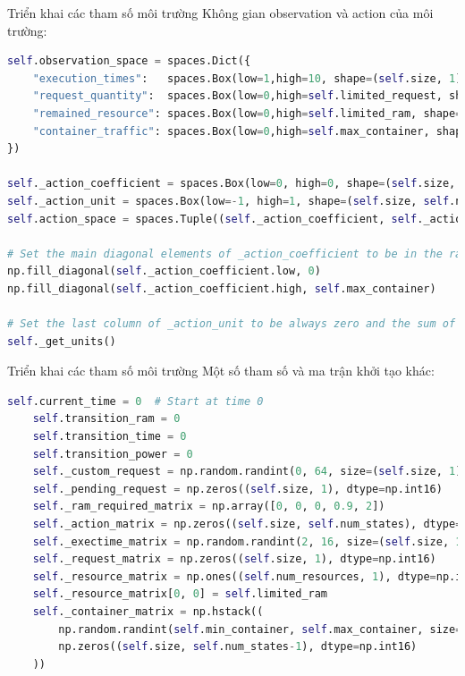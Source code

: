\documentclass[10pt,aspectratio=169]{beamer}
\begin{document}
\begin{frame}[fragile]{Triển khai các tham số môi trường}
Không gian observation và action của môi trường:\\
\vspace{8pt}
\tiny
\begin{lstlisting}[language=Python]
self.observation_space = spaces.Dict({
    "execution_times":   spaces.Box(low=1,high=10, shape=(self.size, 1), dtype=np.int16),
    "request_quantity":  spaces.Box(low=0,high=self.limited_request, shape=(self.size, 1),dtype=np.int16),
    "remained_resource": spaces.Box(low=0,high=self.limited_ram, shape=(self.num_resources, 1),dtype=np.int16),
    "container_traffic": spaces.Box(low=0,high=self.max_container, shape=(self.size, self.num_states),dtype=np.int16),
})
        
self._action_coefficient = spaces.Box(low=0, high=0, shape=(self.size, self.size), dtype=np.int16)
self._action_unit = spaces.Box(low=-1, high=1, shape=(self.size, self.num_states), dtype=np.int16)
self.action_space = spaces.Tuple((self._action_coefficient, self._action_unit))
        
# Set the main diagonal elements of _action_coefficient to be in the range [0, self.max_container] 
np.fill_diagonal(self._action_coefficient.low, 0)
np.fill_diagonal(self._action_coefficient.high, self.max_container)
        
# Set the last column of _action_unit to be always zero and the sum of the elements in a row of _action_unit = 0
self._get_units()
\end{lstlisting}
\end{frame}

\begin{frame}[fragile]{Triển khai các tham số môi trường}
Một số tham số và ma trận khởi tạo khác:\\
\vspace{8pt}
\scriptsize
\begin{lstlisting}[language=Python]
    self.current_time = 0  # Start at time 0
    self.transition_ram = 0 
    self.transition_time = 0
    self.transition_power = 0 
    self._custom_request = np.random.randint(0, 64, size=(self.size, 1))
    self._pending_request = np.zeros((self.size, 1), dtype=np.int16) 
    self._ram_required_matrix = np.array([0, 0, 0, 0.9, 2])
    self._action_matrix = np.zeros((self.size, self.num_states), dtype=np.int16) 
    self._exectime_matrix = np.random.randint(2, 16, size=(self.size, 1))
    self._request_matrix = np.zeros((self.size, 1), dtype=np.int16)
    self._resource_matrix = np.ones((self.num_resources, 1), dtype=np.int16)
    self._resource_matrix[0, 0] = self.limited_ram
    self._container_matrix = np.hstack((
        np.random.randint(self.min_container, self.max_container, size=(self.size, 1)),
        np.zeros((self.size, self.num_states-1), dtype=np.int16)
    )) 
\end{lstlisting}
\end{frame}
\end{document}

